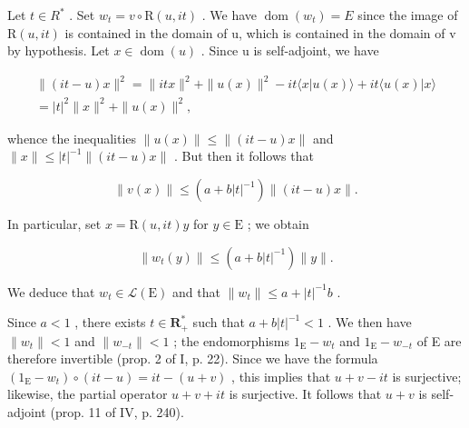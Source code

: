 Let \(t \in R^{*}\) . Set \(w_{t} = v \circ \mathrm{R}(u, it)\) . We have \(\operatorname{dom}(w_{t}) = E\) since the image of \(\mathrm{R}(u, it)\) is contained in the domain of u, which is contained in the domain of v by hypothesis. Let \(x \in \operatorname{dom}(u)\) . Since u is self-adjoint, we have

\[
\begin{array}{c} \| (i t - u) x \| ^ {2} = \| i t x \| ^ {2} + \| u (x) \| ^ {2} - i t \langle x | u (x) \rangle + i t \langle u (x) | x \rangle \\ = | t | ^ {2} \| x \| ^ {2} + \| u (x) \| ^ {2}, \end{array}
\]

whence the inequalities \(\|u(x)\|\leqslant\|(it-u)x\|\) and \(\|x\|\leqslant|t|^{-1}\|(it-u)x\|\) . But then it follows that

\[
\| v (x) \| \leqslant (a + b | t | ^ {- 1}) \| (i t - u) x \|.
\]

In particular, set \(x = \mathrm{R}(u, it)y\) for \(y \in \mathrm{E}\) ; we obtain

\[
\| w _ {t} (y) \| \leqslant (a + b | t | ^ {- 1}) \| y \|.
\]

We deduce that \(w_{t}\in\mathcal{L}(\mathrm{E})\) and that \(\|w_{t}\|\leqslant a+|t|^{-1}b\) .

Since \(a < 1\) , there exists \(t \in \mathbf{R}_{+}^{*}\) such that \(a + b|t|^{-1} < 1\) . We then have \(\|w_{t}\| < 1\) and \(\|w_{-t}\| < 1\) ; the endomorphisms \(1_{\mathrm{E}} - w_{t}\) and \(1_{\mathrm{E}} - w_{-t}\) of E are therefore invertible (prop. 2 of I, p. 22). Since we have the formula \((1_{\mathrm{E}} - w_{t}) \circ (it - u) = it - (u + v)\) , this implies that \(u + v - it\) is surjective; likewise, the partial operator \(u + v + it\) is surjective. It follows that \(u + v\) is self-adjoint (prop. 11 of IV, p. 240).

